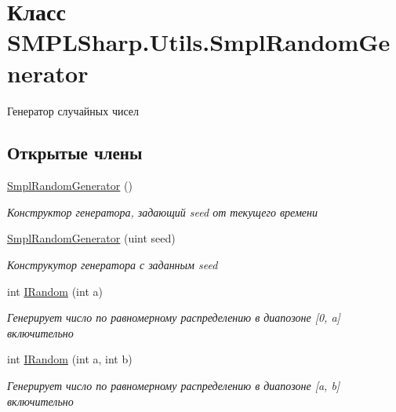 \hypertarget{class_s_m_p_l_sharp_1_1_utils_1_1_smpl_random_generator}{\section{Класс S\-M\-P\-L\-Sharp.\-Utils.\-Smpl\-Random\-Generator}
\label{d0/d33/class_s_m_p_l_sharp_1_1_utils_1_1_smpl_random_generator}
}


Генератор случайных чисел  


\subsection*{Открытые члены}
\begin{DoxyCompactItemize}
\item 
\hyperlink{class_s_m_p_l_sharp_1_1_utils_1_1_smpl_random_generator_a9d439665f33bcdfe0fdbbbfb9c5fc1cc}{Smpl\-Random\-Generator} ()
\begin{DoxyCompactList}\small\item\em Конструктор генератора, задающий seed от текущего времени \end{DoxyCompactList}\item 
\hyperlink{class_s_m_p_l_sharp_1_1_utils_1_1_smpl_random_generator_acad36ef628128994cdc3794e446a2270}{Smpl\-Random\-Generator} (uint seed)
\begin{DoxyCompactList}\small\item\em Конструкутор генератора с заданным seed \end{DoxyCompactList}\item 
int \hyperlink{class_s_m_p_l_sharp_1_1_utils_1_1_smpl_random_generator_a994f652133d2e2fa3376b1f1fe9a92f3}{I\-Random} (int a)
\begin{DoxyCompactList}\small\item\em Генерирует число по равномерному распределению в диапозоне \mbox{[}0, a\mbox{]} включительно \end{DoxyCompactList}\item 
int \hyperlink{class_s_m_p_l_sharp_1_1_utils_1_1_smpl_random_generator_a035b90ad53dd8554179838eecbc2eca9}{I\-Random} (int a, int b)
\begin{DoxyCompactList}\small\item\em Генерирует число по равномерному распределению в диапозоне \mbox{[}a, b\mbox{]} включительно \end{DoxyCompactList}\item 

\end{DoxyCompactItemize}
